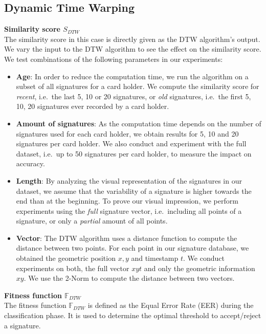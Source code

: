 \documentclass[a4paper, oneside]{csthesis}
\begin{document}
\newpage
\subsection{Dynamic Time Warping}

\textbf{Similarity score $S_{DTW}$}\\
The similarity score in this case is directly given as the DTW algorithm's output.
We vary the input to the DTW algorithm to see the effect on the similarity score. We test combinations of the following parameters in our experiments:
\begin{itemize}
\item \textbf{Age}: In order to reduce the computation time, we run the algorithm on a subset of all signatures for a card holder. We compute the similarity score for \emph{recent}, i.e.\ the last 5, 10 or 20 signatures, or \emph{old} signatures, i.e.\ the first 5, 10, 20 signatures ever recorded by a card holder.
\item \textbf{Amount of signatures}: As the computation time depends on the number of signatures used for each card holder, we obtain results for 5, 10 and 20 signatures per card holder. We also conduct and experiment with the full dataset, i.e.\ up to 50 signatures per card holder, to measure the impact on accuracy.
\item \textbf{Length}: By analyzing the visual representation of the signatures in our dataset, we assume that the variability of a signature is higher towards the end than at the beginning. To prove our visual impression, we perform experiments using the \emph{full} signature vector, i.e.\ including all points of a signature, or only a \emph{partial} amount of all points.
\item \textbf{Vector}: The DTW algorithm uses a distance function to compute the distance between two points. For each point in our signature database, we obtained the geometric position $x, y$ and timestamp $t$. We conduct experiments on both, the full vector $xyt$ and only the geometric information $xy$. We use the 2-Norm to compute the distance between two vectors.
\end{itemize}

\textbf{Fitness function $\mathbb{F}_{DTW}$}\\

The fitness function $\mathbb{F}_{DTW}$ is defined as the Equal Error Rate (EER) during the classification phase. It is used to determine the optimal threshold to accept/reject a signature.
\end{document}

